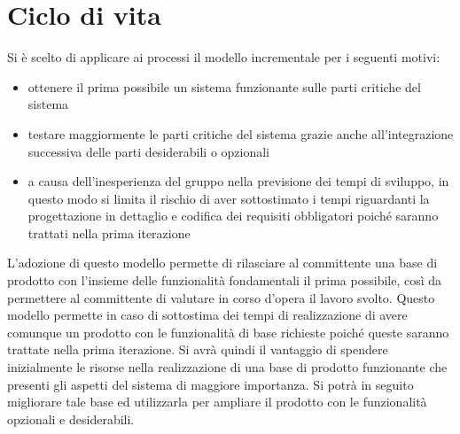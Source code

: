 \section{Ciclo di vita}{
	Si \`{e} scelto di applicare ai processi il modello incrementale per i seguenti motivi:
	\begin{itemize}
		\item ottenere il prima possibile un sistema funzionante sulle parti critiche del sistema
		\item testare maggiormente le parti critiche del sistema grazie anche all'integrazione successiva delle parti desiderabili o opzionali
		\item a causa dell'inesperienza del gruppo nella previsione dei tempi di sviluppo, in questo modo si limita il rischio di aver sottostimato i tempi riguardanti la progettazione in dettaglio e codifica dei requisiti obbligatori poich\'{e} saranno trattati nella prima iterazione
	\end{itemize}
	L'adozione di questo modello permette di rilasciare al committente una base di prodotto con l'insieme delle funzionalit\`{a} fondamentali il prima possibile, cos\`{i} da permettere al committente di valutare in corso d'opera il lavoro svolto. 
	Questo modello permette in caso di sottostima dei tempi di realizzazione di avere comunque un prodotto con le funzionalit\`{a} di base richieste poich\'{e} queste saranno trattate nella prima iterazione.
	Si avr\`{a} quindi il vantaggio di spendere inizialmente le risorse nella realizzazione di una base di prodotto funzionante che presenti gli aspetti del sistema di maggiore importanza. 
	Si potr\`{a} in seguito migliorare tale base ed utilizzarla per ampliare il prodotto con le funzionalit\`{a} opzionali e desiderabili.
}


